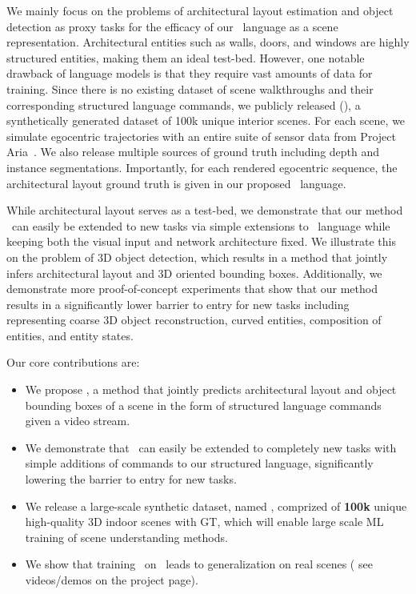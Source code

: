 We mainly focus on the problems of architectural layout estimation and object detection as proxy tasks for the efficacy of our \METHOD~language as a scene representation. Architectural entities such as walls, doors, and windows are highly structured entities, making them an ideal test-bed. However, one notable drawback of language models is that they require vast amounts of data for training. Since there is no existing dataset of scene walkthroughs and their corresponding structured language commands, we publicly released \DatasetName{} (\DatasetNameShort{}),
a synthetically generated dataset of 100k unique interior scenes. For each scene, we simulate egocentric trajectories with an entire suite of sensor data from Project Aria~\cite{projectaria}. We also release multiple sources of ground truth including depth and instance segmentations. Importantly, for each rendered egocentric sequence, the architectural layout ground truth is given in our proposed \METHOD~language.


While architectural layout serves as a test-bed, we demonstrate that our method \METHOD~can easily be extended to new tasks via simple extensions to \METHOD~language while keeping both the visual input and network architecture fixed. We illustrate this on the problem of 3D object detection, which results in a method that jointly infers architectural layout and 3D oriented bounding boxes. Additionally, we demonstrate more proof-of-concept experiments that show that our method results in a significantly lower barrier to entry for new tasks including representing coarse 3D object reconstruction, curved entities, composition of entities, and entity states.

Our core contributions are:
\begin{itemize}
    \item We propose \METHOD, a method that jointly predicts architectural layout and object bounding boxes of a scene in the form of structured language commands given a video stream. 
    \item We demonstrate that \METHOD~can easily be extended 
    to completely new tasks with simple additions of commands to our structured language,
    significantly lowering the barrier to entry for new tasks.
    \item We release a large-scale synthetic dataset, named \DatasetName,
    comprized of \textbf{100k} unique high-quality 3D indoor scenes with GT,
    which will enable large scale ML training of scene understanding methods.
    \item We show that training \METHOD~on \DatasetName~leads to generalization on real scenes (
    see videos/demos on the project page).
\end{itemize}
